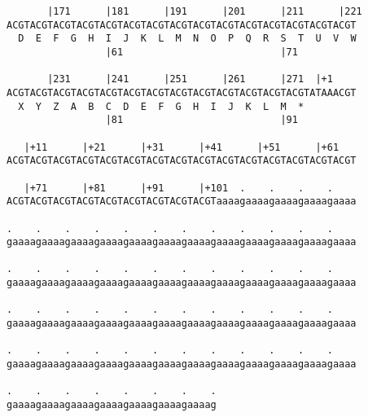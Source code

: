 \documentclass{article}
\begin{document}
\begin{Verbatim}
       |171      |181      |191      |201      |211      |221
ACGTACGTACGTACGTACGTACGTACGTACGTACGTACGTACGTACGTACGTACGTACGT
  D  E  F  G  H  I  J  K  L  M  N  O  P  Q  R  S  T  U  V  W
                 |61                           |71          
  
       |231      |241      |251      |261      |271  |+1    
ACGTACGTACGTACGTACGTACGTACGTACGTACGTACGTACGTACGTACGTATAAACGT
  X  Y  Z  A  B  C  D  E  F  G  H  I  J  K  L  M  *   
                 |81                           |91          
  
   |+11      |+21      |+31      |+41      |+51      |+61   
ACGTACGTACGTACGTACGTACGTACGTACGTACGTACGTACGTACGTACGTACGTACGT
                                                            
   |+71      |+81      |+91      |+101  .    .    .    .    
ACGTACGTACGTACGTACGTACGTACGTACGTACGTaaaagaaaagaaaagaaaagaaaa
                                                            
.    .    .    .    .    .    .    .    .    .    .    .    
gaaaagaaaagaaaagaaaagaaaagaaaagaaaagaaaagaaaagaaaagaaaagaaaa
                                                            
.    .    .    .    .    .    .    .    .    .    .    .    
gaaaagaaaagaaaagaaaagaaaagaaaagaaaagaaaagaaaagaaaagaaaagaaaa
                                                            
.    .    .    .    .    .    .    .    .    .    .    .    
gaaaagaaaagaaaagaaaagaaaagaaaagaaaagaaaagaaaagaaaagaaaagaaaa
                                                            
.    .    .    .    .    .    .    .    .    .    .    .    
gaaaagaaaagaaaagaaaagaaaagaaaagaaaagaaaagaaaagaaaagaaaagaaaa
                                                            
.    .    .    .    .    .    .    . 
gaaaagaaaagaaaagaaaagaaaagaaaagaaaag

                                    
                                     
\end{Verbatim}
\end{document}
